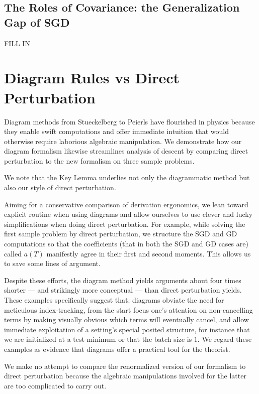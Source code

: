 \documentclass{article}
\begin{document}
    \subsection{The Roles of Covariance: the Generalization Gap of SGD}
        {\color{moor} FILL IN}

       
\section{Diagram Rules vs Direct Perturbation} \label{sect:compare}
    Diagram methods from Stueckelberg to Peierls have flourished in physics
    because they enable swift computations and offer immediate intuition that
    would otherwise require laborious algebraic manipulation.  We demonstrate
    how our diagram formalism likewise streamlines analysis of descent by
    comparing direct perturbation to the new formalism on three sample
    problems.

    We note that the Key Lemma underlies not only the diagrammatic method but
    also our style of direct perturbation.

    Aiming for a conservative comparison of derivation ergonomics, we lean
    toward explicit routine when using diagrams and allow ourselves to use
    clever and lucky simplifications when doing direct perturbation.  For
    example, while solving the first sample problem by direct perturbation,
    we structure the SGD and GD computations so that the coefficients (that in
    both the SGD and GD cases are) called $a(T)$ manifestly agree in their
    first and second moments.  This allows us to save some lines of argument.

    Despite these efforts, the diagram method yields arguments about four times
    shorter --- and strikingly more conceptual --- than direct perturbation
    yields.  These examples specifically suggest that: diagrams obviate the
    need for meticulous index-tracking, from the start focus one's attention on
    non-cancelling terms by making visually obvious which terms will eventually
    cancel, and allow immediate exploitation of a setting's special posited
    structure, for instance that we are initialized at a test minimum or that
    the batch size is $1$.  We regard these examples as evidence that diagrams
    offer a practical tool for the theorist.

    We make no attempt to compare the renormalized version of our formalism
    to direct perturbation because the algebraic manipulations involved for
    the latter are too complicated to carry out.  
\end{document}
